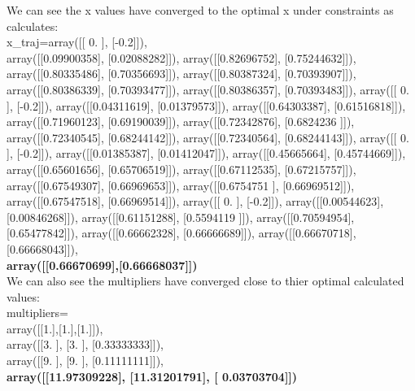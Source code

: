 \documentclass[12pt]{article}
\begin{document}
We can see the x values have converged to the optimal x under constraints as calculates:\\
x\_traj=array([[ 0. ], [-0.2]]),\\ array([[0.09900358],
       [0.02088282]]), array([[0.82696752],
       [0.75244632]]), array([[0.80335486],
       [0.70356693]]), array([[0.80387324],
       [0.70393907]]), array([[0.80386339],
       [0.70393477]]), array([[0.80386357],
       [0.70393483]]), array([[ 0. ],
       [-0.2]]), array([[0.04311619],
       [0.01379573]]), array([[0.64303387],
       [0.61516818]]), array([[0.71960123],
       [0.69190039]]), array([[0.72342876],
       [0.6824236 ]]), array([[0.72340545],
       [0.68244142]]), array([[0.72340564],
       [0.68244143]]), array([[ 0. ],
       [-0.2]]), array([[0.01385387],
       [0.01412047]]), array([[0.45665664],
       [0.45744669]]), array([[0.65601656],
       [0.65706519]]), array([[0.67112535],
       [0.67215757]]), array([[0.67549307],
       [0.66969653]]), array([[0.6754751 ],
       [0.66969512]]), array([[0.67547518],
       [0.66969514]]), array([[ 0. ],
       [-0.2]]), array([[0.00544623],
       [0.00846268]]), array([[0.61151288],
       [0.5594119 ]]), array([[0.70594954],
       [0.65477842]]), array([[0.66662328],
       [0.66666689]]), array([[0.66670718],
       [0.66668043]]),\\
       \textbf{array([[0.66670699],[0.66668037]])}\\

We can also see the multipliers have converged close to thier optimal calculated values:\\
multipliers=\\
array([[1.],[1.],[1.]]),\\
       array([[3.        ],
       [3.        ],
       [0.33333333]]),\\
       array([[9.        ],
       [9.        ],
       [0.11111111]]),\\
       \textbf{array([[11.97309228],
       [11.31201791],
       [ 0.03703704]])}
       
\end{document}
